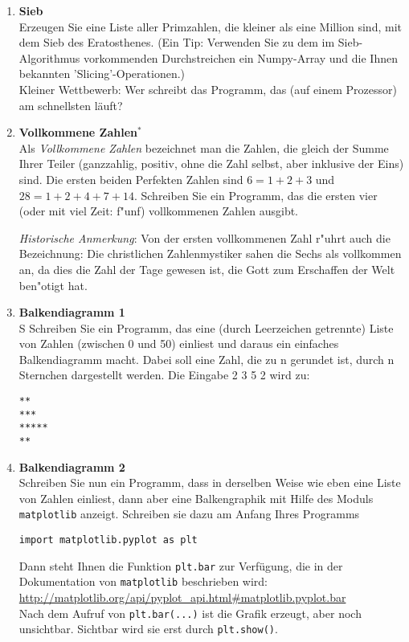 \begin{enumerate}[1.]
\item \textbf{Sieb}\\
Erzeugen Sie eine Liste aller Primzahlen, die 
kleiner als eine Million sind, mit dem Sieb des Eratosthenes. (Ein 
Tip: Verwenden Sie zu dem im Sieb-Algorithmus vorkommenden Durchstreichen
ein Numpy-Array und die Ihnen bekannten 'Slicing'-Operationen.)\\
Kleiner Wettbewerb:  Wer schreibt das Programm, das (auf einem Prozessor)
am schnellsten läuft?


\item \textbf{Vollkommene Zahlen$^*$}\\
Als \emph{Vollkommene Zahlen} bezeichnet man die Zahlen, die gleich der
Summe Ihrer Teiler (ganzzahlig, positiv, ohne die Zahl selbst, aber
inklusive der Eins) sind.  Die ersten beiden Perfekten Zahlen sind $6
= 1 + 2 + 3$ und $28 = 1 + 2 + 4 + 7 + 14$.  Schreiben Sie ein
Programm, das die ersten vier (oder mit viel Zeit: f"unf) vollkommenen
Zahlen ausgibt.


\emph{Historische Anmerkung}: Von der ersten vollkommenen Zahl r"uhrt auch die 
Bezeichnung: Die christlichen Zahlenmystiker sahen die Sechs als vollkommen an, 
da dies die Zahl der Tage gewesen ist, die Gott zum Erschaffen der 
Welt ben"otigt hat.


\item \textbf{Balkendiagramm 1}\\S
Schreiben Sie ein Programm, das eine (durch Leerzeichen getrennte)
Liste von Zahlen (zwischen 0 und 50)  einliest und daraus ein einfaches Balkendiagramm macht.
Dabei soll eine Zahl, die zu n gerundet ist, durch n Sternchen dargestellt werden.
Die Eingabe 2 3 5 2 wird zu:
\begin{verbatim}
**
***
*****
**
\end{verbatim}
\item \textbf{Balkendiagramm 2}\\
Schreiben Sie nun ein Programm, dass in derselben Weise wie eben eine Liste
von Zahlen einliest, dann aber eine Balkengraphik mit Hilfe des Moduls \texttt{matplotlib}
anzeigt. Schreiben sie dazu am Anfang Ihres Programms
\begin{verbatim}
import matplotlib.pyplot as plt
\end{verbatim}
Dann steht Ihnen die Funktion \texttt{plt.bar} zur Verfügung,
die in der Dokumentation von \texttt{matplotlib} beschrieben wird:\\
\url{http://matplotlib.org/api/pyplot_api.html#matplotlib.pyplot.bar}\\
Nach dem Aufruf von \texttt{plt.bar(...)} ist die Grafik erzeugt,
aber noch unsichtbar. Sichtbar wird sie erst  durch \texttt{plt.show()}.


\end{enumerate}
